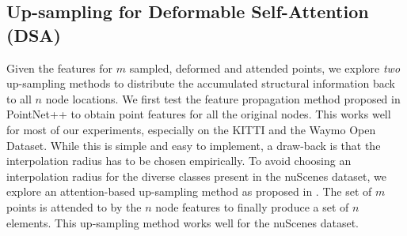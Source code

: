 \documentclass[10pt,twocolumn,letterpaper]{article}
\begin{document}
\subsection{Up-sampling for Deformable Self-Attention (DSA)}
Given the features for $m$ sampled, deformed and attended points, we explore \textit{two} up-sampling methods to distribute the accumulated structural information back to all $n$ node locations. We first test the feature propagation method proposed in PointNet++ \cite{pointnetplusplus} to obtain point features for all the original nodes. This works well for most of our experiments, especially on the KITTI and the Waymo Open Dataset. While this is simple and easy to implement, a draw-back is that the interpolation radius has to be chosen empirically. To avoid choosing an interpolation radius for the diverse classes present in the nuScenes dataset, we explore an attention-based up-sampling method as proposed in \cite{SetTransformer}. The set of $m$ points is attended to by the $n$ node features to finally produce a set of $n$ elements. This up-sampling method works well for the nuScenes dataset.
\setlength{\tabcolsep}{15pt}
\end{document}
